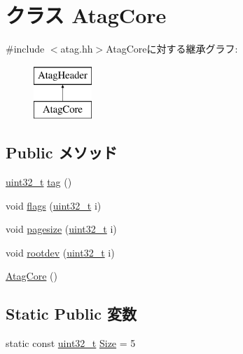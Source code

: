 \hypertarget{classAtagCore}{
\section{クラス AtagCore}
\label{classAtagCore}
}


{\ttfamily \#include $<$atag.hh$>$}AtagCoreに対する継承グラフ:\begin{figure}[H]
\begin{center}
\leavevmode
\includegraphics[height=2cm]{classAtagCore}
\end{center}
\end{figure}
\subsection*{Public メソッド}
\begin{DoxyCompactItemize}
\item 
\hyperlink{Type_8hh_a435d1572bf3f880d55459d9805097f62}{uint32\_\-t} \hyperlink{classAtagCore_afe29fbb80b1d2765e37e98c6d259ea52}{tag} ()
\item 
void \hyperlink{classAtagCore_a9194d847dbae195ee96ef3fb62cac560}{flags} (\hyperlink{Type_8hh_a435d1572bf3f880d55459d9805097f62}{uint32\_\-t} i)
\item 
void \hyperlink{classAtagCore_a0514c636f3ed15e3c9d0d975271b516b}{pagesize} (\hyperlink{Type_8hh_a435d1572bf3f880d55459d9805097f62}{uint32\_\-t} i)
\item 
void \hyperlink{classAtagCore_af4d4fe4fbce50b7557161db8885f1fd1}{rootdev} (\hyperlink{Type_8hh_a435d1572bf3f880d55459d9805097f62}{uint32\_\-t} i)
\item 
\hyperlink{classAtagCore_aa17521239ade4990532d2ff6da15f5af}{AtagCore} ()
\end{DoxyCompactItemize}
\subsection*{Static Public 変数}
\begin{DoxyCompactItemize}
\item 
static const \hyperlink{Type_8hh_a435d1572bf3f880d55459d9805097f62}{uint32\_\-t} \hyperlink{classAtagCore_a7ecea14dd0f3277e19580d4509fafdba}{Size} = 5
\end{DoxyCompactItemize}


